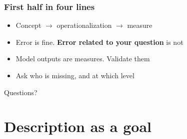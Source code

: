\begin{frame}
\frametitle{First half in four lines}
\centering

\vspace{15pt}
\begin{itemize}
  \item Concept $\rightarrow$ operationalization $\rightarrow$ measure
  \vspace{6pt}
  \item Error is fine. \textbf{Error related to your question} is not
  \vspace{6pt}
  \item Model outputs are measures. Validate them
  \vspace{6pt}
  \item Ask who is missing, and at which level
\end{itemize}

\vspace{15pt}
Questions?

\end{frame}

\section{Description as a goal}


